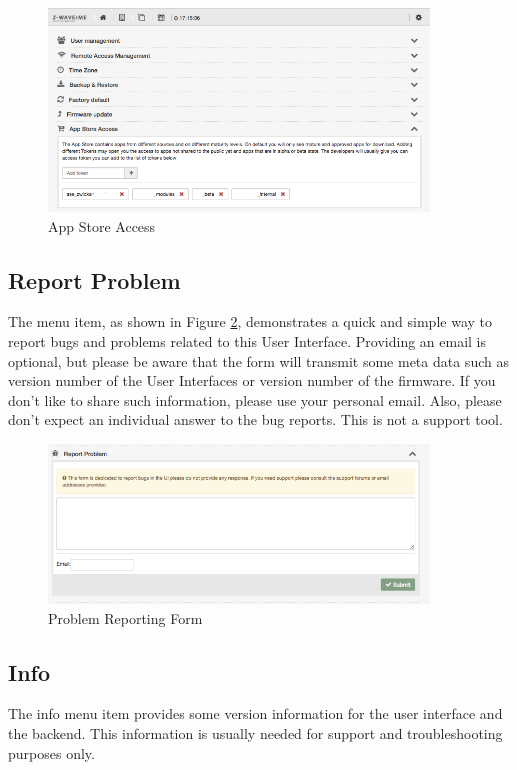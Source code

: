 \begin{figure}
\begin{center}
\includegraphics[width=0.9\textwidth]{pngs/cap4/shui78.png}
\caption{App Store Access}
\label{shui78}
\end{center}
\end{figure}

\subsection{Report Problem}

The menu item, as shown in Figure \ref{shui79}, demonstrates a quick and simple way to 
report bugs and problems related to this User Interface. Providing an email is optional, 
but please be aware that the form will transmit some meta data such as version number of 
the User Interfaces or version number of the firmware. If you don’t like to share such 
information, please use your personal email. Also, please don’t expect an individual 
answer to the bug reports. This is not a support tool.


\begin{figure}
\begin{center}
\includegraphics[width=0.9\textwidth]{pngs/cap4/shui79.png}
\caption{Problem Reporting Form}
\label{shui79}
\end{center}
\end{figure}

\subsection{Info}

The info menu item provides some version information for the user interface and the 
backend. This information is usually needed for support and troubleshooting purposes only.
